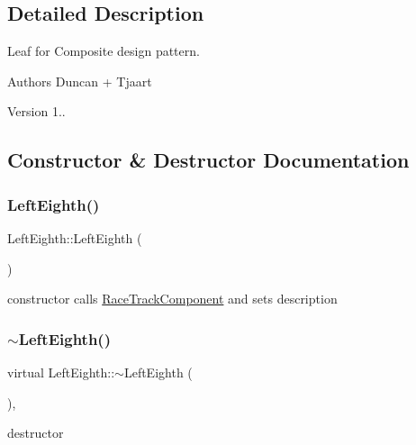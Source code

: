 \subsection{Detailed Description}
Leaf for Composite design pattern. 

\begin{DoxyAuthor}{Authors}
Duncan + Tjaart 
\end{DoxyAuthor}
\begin{DoxyVersion}{Version}
1.. 
\end{DoxyVersion}


\subsection{Constructor \& Destructor Documentation}
\mbox{\label{class_left_eighth_a185923e49b765f96ca16533a2b9608a4}} 
\subsubsection{\texorpdfstring{Left\+Eighth()}{LeftEighth()}}
{\footnotesize\ttfamily Left\+Eighth\+::\+Left\+Eighth (\begin{DoxyParamCaption}{ }\end{DoxyParamCaption})\hspace{0.3cm}{\ttfamily [inline]}}

constructor calls \mbox{\hyperlink{class_race_track_component}{Race\+Track\+Component}} and sets description \mbox{\label{class_left_eighth_af4fffc0d115bf218223396c668653f2b}} 
\subsubsection{\texorpdfstring{$\sim$\+Left\+Eighth()}{~LeftEighth()}}
{\footnotesize\ttfamily virtual Left\+Eighth\+::$\sim$\+Left\+Eighth (\begin{DoxyParamCaption}{ }\end{DoxyParamCaption})\hspace{0.3cm}{\ttfamily [inline]}, {\ttfamily [virtual]}}

destructor 

